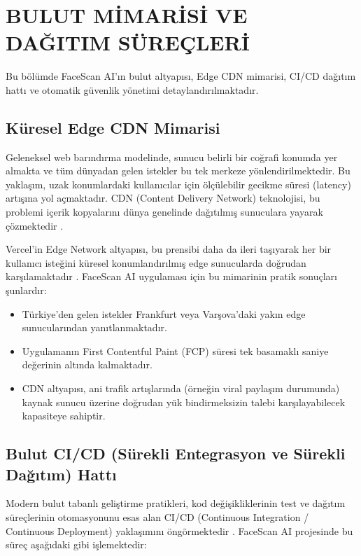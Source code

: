 \section{BULUT MİMARİSİ VE DAĞITIM SÜREÇLERİ}

Bu bölümde FaceScan AI'ın bulut altyapısı, Edge CDN mimarisi, CI/CD dağıtım hattı ve otomatik güvenlik yönetimi detaylandırılmaktadır.

\subsection{Küresel Edge CDN Mimarisi}

Geleneksel web barındırma modelinde, sunucu belirli bir coğrafi konumda yer almakta ve tüm dünyadan gelen istekler bu tek merkeze yönlendirilmektedir. Bu yaklaşım, uzak konumlardaki kullanıcılar için ölçülebilir gecikme süresi (latency) artışına yol açmaktadır. CDN (Content Delivery Network) teknolojisi, bu problemi içerik kopyalarını dünya genelinde dağıtılmış sunuculara yayarak çözmektedir \cite{panda2018cdn}.

Vercel'in Edge Network altyapısı, bu prensibi daha da ileri taşıyarak her bir kullanıcı isteğini küresel konumlandırılmış edge sunucularda doğrudan karşılamaktadır \cite{vercel2023docs}. FaceScan AI uygulaması için bu mimarinin pratik sonuçları şunlardır:
\begin{itemize}
  \item Türkiye'den gelen istekler Frankfurt veya Varşova'daki yakın edge sunucularından yanıtlanmaktadır.
  \item Uygulamanın First Contentful Paint (FCP) süresi tek basamaklı saniye değerinin altında kalmaktadır.
  \item CDN altyapısı, ani trafik artışlarında (örneğin viral paylaşım durumunda) kaynak sunucu üzerine doğrudan yük bindirmeksizin talebi karşılayabilecek kapasiteye sahiptir.
\end{itemize}

\subsection{Bulut CI/CD (Sürekli Entegrasyon ve Sürekli Dağıtım) Hattı}

Modern bulut tabanlı geliştirme pratikleri, kod değişikliklerinin test ve dağıtım süreçlerinin otomasyonunu esas alan CI/CD (Continuous Integration / Continuous Deployment) yaklaşımını öngörmektedir \cite{buyya2009cloud}. FaceScan AI projesinde bu süreç aşağıdaki gibi işlemektedir:

